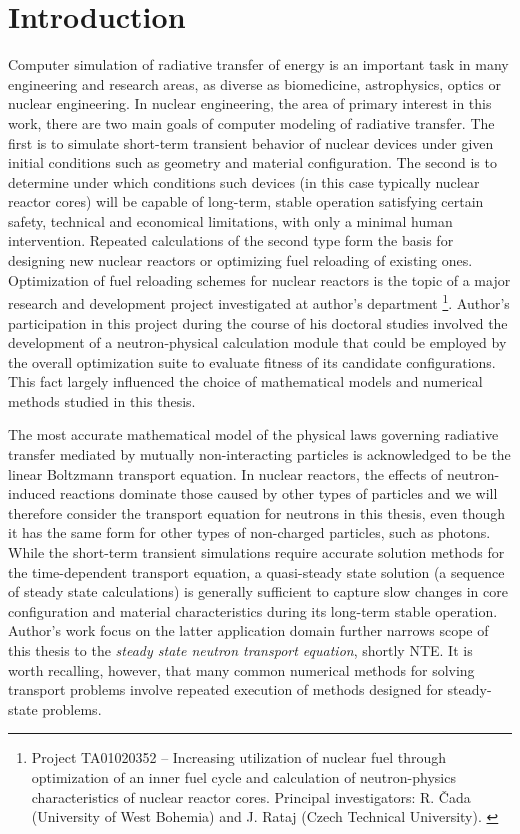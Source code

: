 \chapter{Introduction}

Computer simulation of radiative transfer of energy is an important task in many engineering and research areas, as
diverse as biomedicine, astrophysics, optics or nuclear engineering. In nuclear engineering, the area of primary
interest in this work, there are two main goals of computer modeling of radiative transfer. The first is
to simulate short-term transient behavior of nuclear devices under given initial conditions such as geometry and material
configuration. The second is to determine under which conditions such devices (in this case typically nuclear reactor
cores) will be capable of long-term, stable operation satisfying certain safety, technical and economical limitations,
with only a minimal human intervention. Repeated calculations of the second type form the basis for designing new
nuclear reactors or optimizing fuel reloading of existing ones. Optimization of fuel reloading schemes for nuclear
reactors is the topic of a major research and development project investigated at author's department
\footnote{Project TA01020352 -- Increasing utilization of nuclear fuel through optimization of an inner fuel cycle and
calculation of neutron-physics characteristics of nuclear reactor cores. Principal investigators: R. {\v C}ada
(University of West Bohemia) and J. Rataj (Czech Technical University). \label{ftn:TACR}}.
Author's participation in this project during the course of his doctoral studies involved the development of a
neutron-physical calculation module that could be employed by the overall optimization suite to evaluate fitness of its
candidate configurations. This fact largely influenced the choice of mathematical models and
numerical methods studied in this thesis.

The most accurate mathematical model of the physical laws governing radiative transfer mediated by mutually
non-interacting particles is acknowledged to be the linear Boltzmann transport equation. In nuclear reactors, the
effects of neutron-induced reactions dominate those caused by other types of particles and we will therefore consider
the transport equation for neutrons in this thesis, even though it has the same form for other types of non-charged
particles, such as photons. While the short-term transient simulations require accurate solution methods for the
time-dependent transport equation, a quasi-steady state solution (a sequence of steady state calculations) is generally
sufficient to capture slow changes in core configuration and material characteristics during its long-term stable
operation.
Author's work focus on the latter application domain further narrows scope of this thesis to the \textit{steady state
neutron transport equation}, shortly NTE. It is worth recalling, however, that many common numerical methods
for solving transport problems involve repeated execution of methods designed for steady-state problems.

